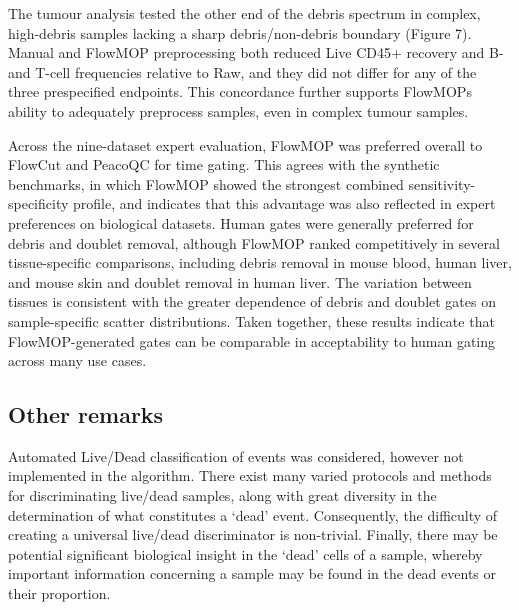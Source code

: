 \documentclass[ASNA]{latex/wiley/USG}
\begin{document}
The tumour analysis tested the other end of the debris spectrum in
complex, high-debris samples lacking a sharp debris/non-debris boundary
(Figure 7). Manual and FlowMOP preprocessing both reduced Live CD45+
recovery and B- and T-cell frequencies relative to Raw, and they did not
differ for any of the three prespecified endpoints. This concordance
further supports FlowMOP\textquotesingle s ability to adequately
preprocess samples, even in complex tumour samples.

Across the nine-dataset expert evaluation, FlowMOP was preferred overall
to FlowCut and PeacoQC for time gating. This agrees with the synthetic
benchmarks, in which FlowMOP showed the strongest combined
sensitivity-specificity profile, and indicates that this advantage was
also reflected in expert preferences on biological datasets. Human gates
were generally preferred for debris and doublet removal, although
FlowMOP ranked competitively in several tissue-specific comparisons,
including debris removal in mouse blood, human liver, and mouse skin and
doublet removal in human liver. The variation between tissues is
consistent with the greater dependence of debris and doublet gates on
sample-specific scatter distributions. Taken together, these results
indicate that FlowMOP-generated gates can be comparable in acceptability
to human gating across many use cases.

\subsection{Other remarks}\label{other-remarks}

Automated Live/Dead classification of events was considered, however not
implemented in the algorithm. There exist many varied protocols and
methods for discriminating live/dead samples, along with great diversity
in the determination of what constitutes a `dead' event. Consequently,
the difficulty of creating a universal live/dead discriminator is
non-trivial. Finally, there may be potential significant biological
insight in the `dead' cells of a sample, whereby important information
concerning a sample may be found in the dead events or their proportion.
\end{document}
